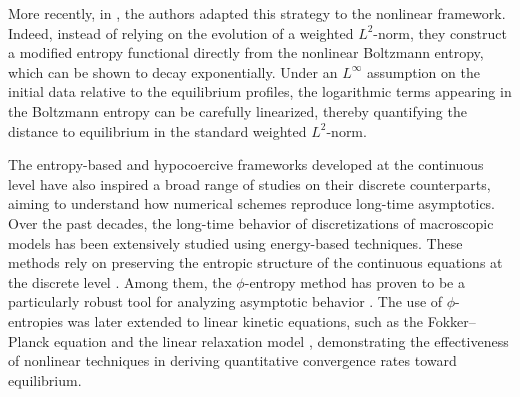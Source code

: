 \documentclass[reqno]{amsart}
\numberwithin{equation}{section}
\begin{document}
More recently, in \cite{FavrePirnerSchmeiser2023}, the authors adapted this strategy to the nonlinear framework. Indeed, instead of relying on the evolution of a weighted $L^2$-norm, they construct a modified entropy functional directly from the nonlinear Boltzmann entropy, which can be shown to decay exponentially. Under an $L^\infty$ assumption on the initial data relative to the equilibrium profiles, the logarithmic terms appearing in the Boltzmann entropy can be carefully linearized, thereby quantifying the distance to equilibrium in the standard weighted $L^2$-norm. 


The entropy-based and hypocoercive frameworks developed at the continuous level have also inspired a broad range of studies on their discrete counterparts, aiming to understand how numerical schemes reproduce long-time asymptotics. Over the past decades, the long-time behavior of discretizations of macroscopic models has been extensively studied using energy-based techniques. These methods rely on preserving the entropic structure of the continuous equations at the discrete level \cite{GosseToscani2006, ChainaisFilbet2007, BurgerCarrilloWolfram2010, BessemoulinChatardFilbet2012}. Among them, the $\phi$-entropy method has proven to be a particularly robust tool for analyzing asymptotic behavior \cite{FilbetHerda2017, ChainaisHillairetHerda2020}. The use of $\phi$-entropies was later extended to linear kinetic equations, such as the Fokker–Planck equation \cite{DolbeaultLi2018} and the linear relaxation model \cite{Evans2021}, demonstrating the effectiveness of nonlinear techniques in deriving quantitative convergence rates toward equilibrium.
\end{document}

